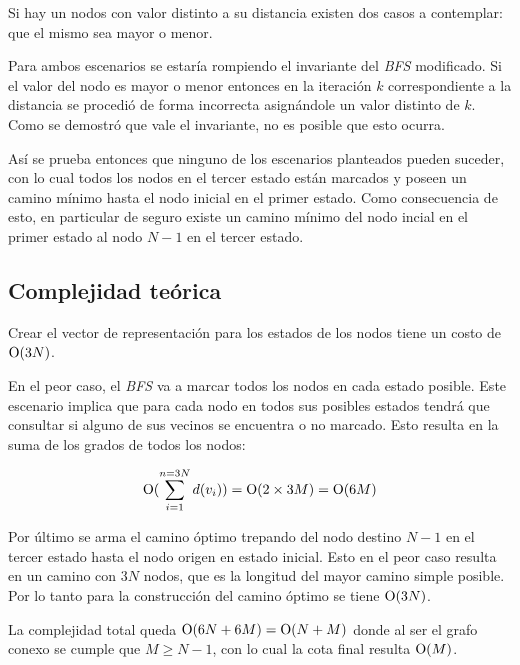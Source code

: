 	Si hay un nodos con valor distinto a su distancia existen dos casos
	a contemplar: que el mismo sea mayor o menor.

	Para ambos escenarios se estaría rompiendo el invariante del \emph{BFS}
	modificado. Si el valor del nodo es mayor o menor entonces en
	la iteración $k$ correspondiente a la distancia se procedió de forma
	incorrecta asignándole un valor distinto de $k$. Como se demostró que vale el
	invariante, no es posible que esto ocurra.

	Así se prueba entonces que ninguno de los escenarios planteados pueden
	suceder, con lo cual todos los nodos en el tercer estado están marcados y
	poseen un camino mínimo hasta el nodo inicial en el primer estado. Como
	consecuencia de esto, en particular de seguro existe un camino mínimo del
	nodo incial en el primer estado al nodo $N - 1$ en el tercer estado.

    \subsection{Complejidad teórica}
    Crear el vector de representación para los estados de los nodos tiene un
	costo de $\operatorname{O}(3N)$.

	En el peor caso, el \emph{BFS} va a marcar todos los nodos en cada estado
	posible. Este escenario implica que para cada nodo en todos sus posibles
	estados tendrá que consultar si alguno de sus vecinos se encuentra o no
	marcado. Esto resulta en la suma de los grados de todos los nodos:

	\begin{equation*}
		\operatorname{O}(\sum_{i=1}^{n=3 N} d(v_i)) = \operatorname{O}(2 \times 3M) = \operatorname{O}(6M)
	\end{equation*}

	Por último se arma el camino óptimo trepando del nodo destino $N - 1$ en el
	tercer estado hasta el nodo origen en estado inicial. Esto en el peor caso
	resulta en un camino con $3N$ nodos, que es la longitud del mayor camino
	simple posible. Por lo tanto para la construcción del camino óptimo se
	tiene $\operatorname{O}(3N)$.

	La complejidad total queda $\operatorname{O}(6N + 6M) = \operatorname{O}(N + M)$ donde al ser el
	grafo conexo se cumple que $M \geq N - 1$, con lo cual la cota final resulta $\operatorname{O}(M)$.

